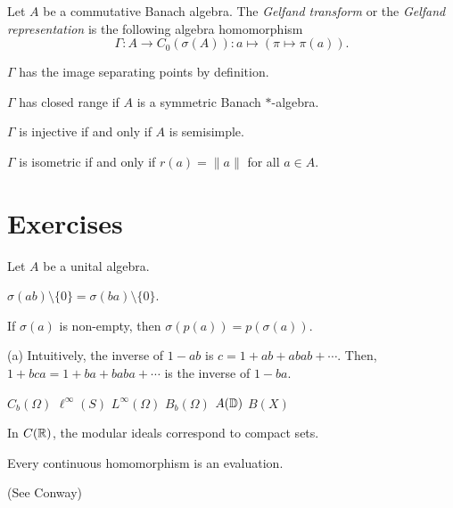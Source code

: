 \documentclass{../../large}
\begin{document}
\begin{prb}
Let $A$ be a commutative Banach algebra.
The \emph{Gelfand transform} or the \emph{Gelfand representation} is the following algebra homomorphism
\[\Gamma:A\to C_0(\sigma(A)):a\mapsto(\pi\mapsto\pi(a)).\]
\begin{parts}
\item $\Gamma$ has the image separating points by definition.
\item $\Gamma$ has closed range if $A$ is a symmetric Banach $*$-algebra.
\item $\Gamma$ is injective if and only if $A$ is semisimple.
\item $\Gamma$ is isometric if and only if $r(a)=\|a\|$ for all $a\in A$.
\end{parts}
\end{prb}





\section*{Exercises}
\begin{prb}
Let $A$ be a unital algebra.
\begin{parts}
\item $\sigma(ab)\setminus\{0\}=\sigma(ba)\setminus\{0\}$.
\item If $\sigma(a)$ is non-empty, then $\sigma(p(a))=p(\sigma(a))$.
\end{parts}
\end{prb}
\begin{pf}
(a)
Intuitively, the inverse of $1-ab$ is $c=1+ab+abab+\cdots$.
Then, $1+bca=1+ba+baba+\cdots$ is the inverse of $1-ba$.
\end{pf}

$C_b(\Omega)$ $\ell^\infty(S)$ $L^\infty(\Omega)$ $B_b(\Omega)$ $A(\mathbb{D})$
$B(X)$

\begin{prb}
In $C(\mathbb{R})$, the modular ideals correspond to compact sets.
\end{prb}

\begin{prb}
\begin{parts}
\item Every continuous homomorphism is an evaluation.
\end{parts}
\end{prb}

\begin{prb}
(See Conway)
\end{prb}
\end{document}
